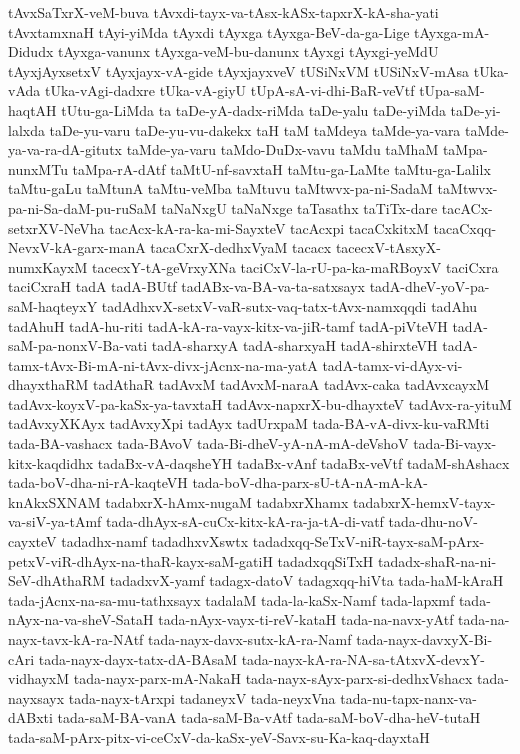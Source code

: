 {tAvxSaTxrX-veM-buva
tAvxdi-tayx-va-tAsx-kASx-tapxrX-kA-sha-yati
tAvxtamxnaH
tAyi-yiMda
tAyxdi
tAyxga
tAyxga-BeV-da-ga-Lige
tAyxga-mA-Didudx
tAyxga-vanunx
tAyxga-veM-bu-danunx
tAyxgi
tAyxgi-yeMdU
tAyxjAyxsetxV
tAyxjayx-vA-gide
tAyxjayxveV
tUSiNxVM
tUSiNxV-mAsa
tUka-vAda
tUka-vAgi-dadxre
tUka-vA-giyU
tUpA-sA-vi-dhi-BaR-veVtf
tUpa-saM-haqtAH
tUtu-ga-LiMda
ta
taDe-yA-dadx-riMda
taDe-yalu
taDe-yiMda
taDe-yi-lalxda
taDe-yu-varu
taDe-yu-vu-dakekx
taH
taM
taMdeya
taMde-ya-vara
taMde-ya-va-ra-dA-gitutx
taMde-ya-varu
taMdo-DuDx-vavu
taMdu
taMhaM
taMpa-nunxMTu
taMpa-rA-dAtf
taMtU-nf-savxtaH
taMtu-ga-LaMte
taMtu-ga-Lalilx
taMtu-gaLu
taMtunA
taMtu-veMba
taMtuvu
taMtwvx-pa-ni-SadaM
taMtwvx-pa-ni-Sa-daM-pu-ruSaM
taNaNxgU
taNaNxge
taTasathx
taTiTx-dare
tacACx-setxrXV-NeVha
tacAcx-kA-ra-ka-mi-SayxteV
tacAcxpi
tacaCxkitxM
tacaCxqq-NevxV-kA-garx-manA
tacaCxrX-dedhxVyaM
tacacx
tacecxV-tAsxyX-numxKayxM
tacecxY-tA-geVrxyXNa
taciCxV-la-rU-pa-ka-maRBoyxV
taciCxra
taciCxraH
tadA
tadA-BUtf
tadABx-va-BA-va-ta-satxsayx
tadA-dheV-yoV-pa-saM-haqteyxY
tadAdhxvX-setxV-vaR-sutx-vaq-tatx-tAvx-namxqqdi
tadAhu
tadAhuH
tadA-hu-riti
tadA-kA-ra-vayx-kitx-va-jiR-tamf
tadA-piVteVH
tadA-saM-pa-nonxV-Ba-vati
tadA-sharxyA
tadA-sharxyaH
tadA-shirxteVH
tadA-tamx-tAvx-Bi-mA-ni-tAvx-divx-jAcnx-na-ma-yatA
tadA-tamx-vi-dAyx-vi-dhayxthaRM
tadAthaR
tadAvxM
tadAvxM-naraA
tadAvx-caka
tadAvxcayxM
tadAvx-koyxV-pa-kaSx-ya-tavxtaH
tadAvx-napxrX-bu-dhayxteV
tadAvx-ra-yituM
tadAvxyXKAyx
tadAvxyXpi
tadAyx
tadUrxpaM
tada-BA-vA-divx-ku-vaRMti
tada-BA-vashacx
tada-BAvoV
tada-Bi-dheV-yA-nA-mA-deVshoV
tada-Bi-vayx-kitx-kaqdidhx
tadaBx-vA-daqsheYH
tadaBx-vAnf
tadaBx-veVtf
tadaM-shAshacx
tada-boV-dha-ni-rA-kaqteVH
tada-boV-dha-parx-sU-tA-nA-mA-kA-knAkxSXNAM
tadabxrX-hAmx-nugaM
tadabxrXhamx
tadabxrX-hemxV-tayx-va-siV-ya-tAmf
tada-dhAyx-sA-cuCx-kitx-kA-ra-ja-tA-di-vatf
tada-dhu-noV-cayxteV
tadadhx-namf
tadadhxvXswtx
tadadxqq-SeTxV-niR-tayx-saM-pArx-petxV-viR-dhAyx-na-thaR-kayx-saM-gatiH
tadadxqqSiTxH
tadadx-shaR-na-ni-SeV-dhAthaRM
tadadxvX-yamf
tadagx-datoV
tadagxqq-hiVta
tada-haM-kAraH
tada-jAcnx-na-sa-mu-tathxsayx
tadalaM
tada-la-kaSx-Namf
tada-lapxmf
tada-nAyx-na-va-sheV-SataH
tada-nAyx-vayx-ti-reV-kataH
tada-na-navx-yAtf
tada-na-nayx-tavx-kA-ra-NAtf
tada-nayx-davx-sutx-kA-ra-Namf
tada-nayx-davxyX-Bi-cAri
tada-nayx-dayx-tatx-dA-BAsaM
tada-nayx-kA-ra-NA-sa-tAtxvX-devxY-vidhayxM
tada-nayx-parx-mA-NakaH
tada-nayx-sAyx-parx-si-dedhxVshacx
tada-nayxsayx
tada-nayx-tArxpi
tadaneyxV
tada-neyxVna
tada-nu-tapx-nanx-va-dABxti
tada-saM-BA-vanA
tada-saM-Ba-vAtf
tada-saM-boV-dha-heV-tutaH
tada-saM-pArx-pitx-vi-ceCxV-da-kaSx-yeV-Savx-su-Ka-kaq-dayxtaH
}
